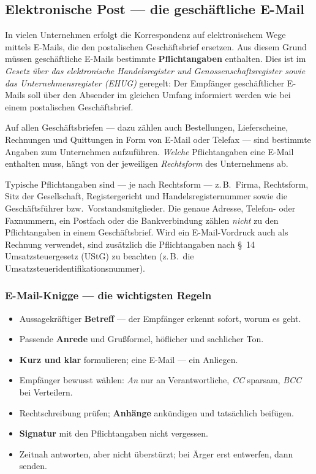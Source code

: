 \documentclass[11pt, a4paper]{article}
\begin{document}
\subsection{Elektronische Post --- die geschäftliche E-Mail}

In vielen Unternehmen erfolgt die Korrespondenz auf elektronischem Wege mittels E-Mails,
die den postalischen Geschäftsbrief ersetzen. Aus diesem Grund müssen geschäftliche
E-Mails bestimmte \textbf{Pflichtangaben} enthalten. Dies ist im \emph{Gesetz über das
elektronische Handelsregister und Genossenschaftsregister sowie das Unternehmens\-register
(EHUG)} geregelt: Der Empfänger geschäftlicher E-Mails soll über den Absender im gleichen
Umfang informiert werden wie bei einem postalischen Geschäftsbrief.

\begin{merksatz}
Auf allen Geschäftsbriefen --- dazu zählen auch Bestellungen, Lieferscheine, Rechnungen
und Quittungen in Form von E-Mail oder Telefax --- sind bestimmte Angaben zum Unternehmen
aufzuführen. \emph{Welche} Pflichtangaben eine E-Mail enthalten muss, hängt von der
jeweiligen \emph{Rechtsform} des Unternehmens ab.
\end{merksatz}

Typische Pflichtangaben sind --- je nach Rechtsform --- z.\,B.\ Firma, Rechtsform,
Sitz der Gesellschaft, Registergericht und Handelsregisternummer sowie die Geschäfts\-führer
bzw.\ Vorstandsmitglieder. Die genaue Adresse, Telefon- oder Faxnummern, ein Postfach
oder die Bankverbindung zählen \emph{nicht} zu den Pflichtangaben in einem Geschäftsbrief.
Wird ein E-Mail-Vordruck auch als Rechnung verwendet, sind zusätzlich die Pflichtangaben
nach \S~14 Umsatzsteuergesetz (UStG) zu beachten (z.\,B.\ die
Umsatzsteueridentifikations\-nummer).

\subsubsection*{E-Mail-Knigge --- die wichtigsten Regeln}

\begin{itemize}
  \item Aussagekräftiger \textbf{Betreff} --- der Empfänger erkennt sofort, worum es geht.
  \item Passende \textbf{Anrede} und Grußformel, höflicher und sachlicher Ton.
  \item \textbf{Kurz und klar} formulieren; eine E-Mail --- ein Anliegen.
  \item Empfänger bewusst wählen: \emph{An} nur an Verantwortliche, \emph{CC} sparsam,
    \emph{BCC} bei Verteilern.
  \item Rechtschreibung prüfen; \textbf{Anhänge} ankündigen und tatsächlich beifügen.
  \item \textbf{Signatur} mit den Pflichtangaben nicht vergessen.
  \item Zeitnah antworten, aber nicht überstürzt; bei Ärger erst entwerfen, dann senden.
\end{itemize}
\end{document}
